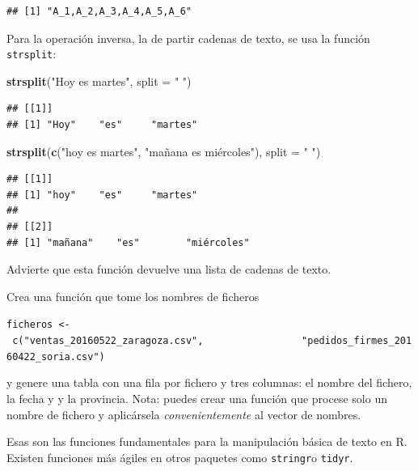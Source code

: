 \documentclass[]{article}
\newenvironment{Shaded}{\begin{snugshade}}{\end{snugshade}}
\newcommand{\KeywordTok}[1]{\textcolor[rgb]{0.13,0.29,0.53}{\textbf{#1}}}
\newcommand{\DataTypeTok}[1]{\textcolor[rgb]{0.13,0.29,0.53}{#1}}
\newcommand{\StringTok}[1]{\textcolor[rgb]{0.31,0.60,0.02}{#1}}
\newcommand{\NormalTok}[1]{#1}
\newenvironment{ej}{\begin{Shaded}}{\end{Shaded}}
\begin{document}
\begin{verbatim}
## [1] "A_1,A_2,A_3,A_4,A_5,A_6"
\end{verbatim}

Para la operación inversa, la de partir cadenas de texto, se usa la
función \texttt{strsplit}:

\begin{Shaded}
\begin{Highlighting}[]
\KeywordTok{strsplit}\NormalTok{(}\StringTok{"Hoy es martes"}\NormalTok{, }\DataTypeTok{split =} \StringTok{" "}\NormalTok{)}
\end{Highlighting}
\end{Shaded}

\begin{verbatim}
## [[1]]
## [1] "Hoy"    "es"     "martes"
\end{verbatim}

\begin{Shaded}
\begin{Highlighting}[]
\KeywordTok{strsplit}\NormalTok{(}\KeywordTok{c}\NormalTok{(}\StringTok{"hoy es martes"}\NormalTok{, }\StringTok{"mañana es miércoles"}\NormalTok{), }\DataTypeTok{split =} \StringTok{" "}\NormalTok{)}
\end{Highlighting}
\end{Shaded}

\begin{verbatim}
## [[1]]
## [1] "hoy"    "es"     "martes"
## 
## [[2]]
## [1] "mañana"    "es"        "miércoles"
\end{verbatim}

Advierte que esta función devuelve una lista de cadenas de texto.

\begin{ej}
Crea una función que tome los nombres de ficheros

\texttt{ficheros\ \textless{}-\ c("ventas\_20160522\_zaragoza.csv",\ \ \ \ \ \ \ \ \ \ \ \ \ \ \ \ \ "pedidos\_firmes\_20160422\_soria.csv")}

y genere una tabla con una fila por fichero y tres columnas: el nombre
del fichero, la fecha y y la provincia. Nota: puedes crear una función
que procese solo un nombre de fichero y aplicársela
\emph{convenientemente} al vector de nombres.
\end{ej}

Esas son las funciones fundamentales para la manipulación básica de
texto en R. Existen funciones más ágiles en otros paquetes como
\texttt{stringr}o \texttt{tidyr}.
\end{document}
